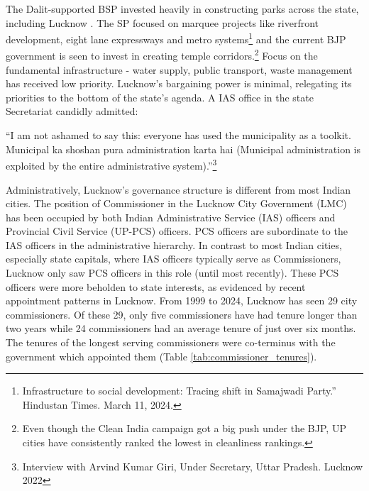 The Dalit-supported BSP invested heavily in constructing parks across the state, including Lucknow \citep{Heath2012}. The SP focused on marquee projects like riverfront development, eight lane expressways and metro systems\footnote{Infrastructure to social development: Tracing shift in Samajwadi Party.'' Hindustan Times. March 11, 2024.} and the current BJP government is seen to invest in creating temple corridors.\footnote{Even though the Clean India campaign got a big push under the BJP, UP cities have consistently ranked the lowest in cleanliness rankings.} Focus on the fundamental infrastructure - water supply, public transport, waste management has received low priority. Lucknow's bargaining power is minimal, relegating its priorities to the bottom of the state's agenda. A IAS office in the state Secretariat candidly admitted:

``I am not ashamed to say this: everyone has used the municipality as a toolkit. Municipal ka shoshan pura administration karta hai (Municipal administration is exploited by the entire administrative system).''\footnote{Interview with Arvind Kumar Giri, Under Secretary, Uttar Pradesh. Lucknow 2022}

Administratively, Lucknow's governance structure is different from most Indian cities. The position of Commissioner in the Lucknow City Government (LMC) has been occupied by both Indian Administrative Service (IAS) officers and Provincial Civil Service (UP-PCS) officers. PCS officers are subordinate to the IAS officers in the administrative hierarchy. In contrast to most Indian cities, especially state capitals, where IAS officers typically serve as Commissioners, Lucknow only saw PCS officers in this role (until most recently). These PCS officers were more beholden to state interests, as evidenced by recent appointment patterns in Lucknow. From 1999 to 2024, Lucknow has seen 29 city commissioners. Of these 29, only five commissioners have had tenure longer than two years while 24 commissioners had an average tenure of just over six months. The tenures of the longest serving commissioners were co-terminus with the government which appointed them (Table \ref{tab:commissioner_tenures}).

